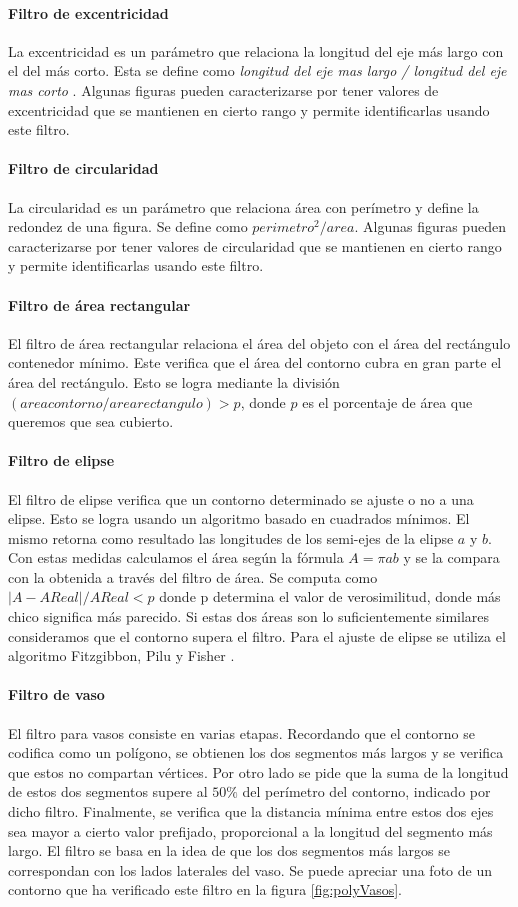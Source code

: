 	\paragraph{Filtro de excentricidad}
	La excentricidad es un parámetro que relaciona la longitud del eje más largo con el del más corto. Esta se define como 
	\textit { longitud del eje mas largo / longitud del eje mas corto}  . Algunas figuras pueden caracterizarse por tener valores de excentricidad
	que se mantienen en cierto rango y permite identificarlas usando este filtro.
	\paragraph{Filtro de circularidad}
	La circularidad es un parámetro que relaciona área con perímetro y define la redondez de una figura. Se define como $perimetro^2/area$. Algunas figuras pueden 
	caracterizarse por tener valores de circularidad que se mantienen en cierto rango y permite identificarlas usando este filtro.
	\paragraph{Filtro de área rectangular}
	El filtro de área rectangular relaciona el área del objeto con el área del rectángulo contenedor mínimo. Este verifica que el área
	del contorno cubra en gran parte el área del rectángulo. Esto se logra mediante la división $(area contorno / area rectangulo)> p$, donde 
	$p$ es el porcentaje de área que queremos que sea cubierto.
	\paragraph{Filtro de elipse}
	El filtro de elipse verifica que un contorno determinado se ajuste o no a una elipse. Esto se logra usando un algoritmo basado 
	en cuadrados mínimos. El mismo retorna como resultado las longitudes de los semi-ejes de la elipse $a$ y $b$. Con estas medidas calculamos
	el área según la fórmula $A=\pi a  b$ y se la compara con la 
	obtenida a través del filtro de área. Se computa como $|A-AReal|/ 
	AReal < p$ donde p determina el
	valor de verosimilitud, donde más chico significa más parecido. Si estas dos áreas son lo suficientemente similares consideramos que el contorno supera el filtro. 
	Para el ajuste de elipse se utiliza el algoritmo Fitzgibbon, Pilu y Fisher \cite{Fitzgibbon99}.
	\paragraph{Filtro de vaso}
	El filtro para vasos consiste en varias etapas. Recordando que el contorno se codifica como un polígono, se obtienen los dos segmentos 
	más largos y se verifica que estos no compartan vértices. Por otro lado se pide que la suma de la longitud de estos dos segmentos supere al $50\%$ del 
	perímetro del contorno, indicado por dicho filtro. Finalmente, se verifica que la distancia mínima entre estos dos ejes sea mayor a cierto valor prefijado, proporcional a la
	longitud del segmento más largo. El filtro se basa en la idea de que 
	los dos segmentos más largos se correspondan con los lados laterales 
	del vaso.  Se puede apreciar una foto  de un contorno que ha 
	verificado este filtro en la figura \ref{fig:polyVasos}. 
